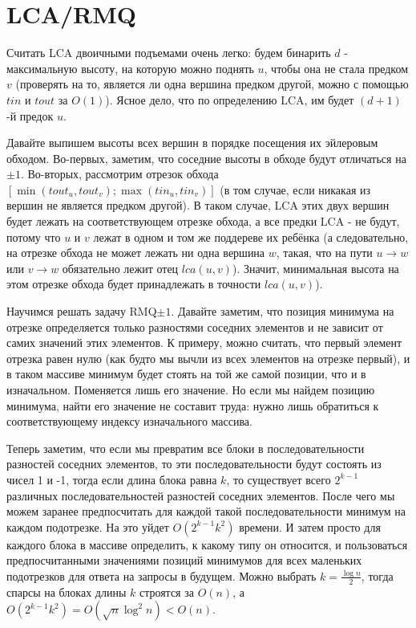 \section{LCA/RMQ}

Считать LCA двоичными подъемами очень легко: будем бинарить $d$ - максимальную высоту, на которую можно поднять $u$, чтобы она не стала предком $v$ (проверять на то, является ли одна вершина предком другой, можно с помощью $tin$ и $tout$ за $O(1)$). Ясное дело, что по определению LCA, им будет $(d+1)$-й предок $u$.

Давайте выпишем высоты всех вершин в порядке посещения их эйлеровым обходом. Во-первых, заметим, что соседние высоты в обходе будут отличаться на $\pm 1$. Во-вторых, рассмотрим отрезок обхода $[\min(tout_u, tout_v); \max(tin_u, tin_v)]$ (в том случае, если никакая из вершин не является предком другой). В таком случае, LCA этих двух вершин будет лежать на соответствующем отрезке обхода, а все предки LCA - не будут, потому что $u$ и $v$ лежат в одном и том же поддереве их ребёнка (а следовательно, на отрезке обхода не может лежать ни одна вершина $w$, такая, что на пути $u \to w$ или $v \to w$ обязательно лежит отец $lca(u, v)$). Значит, минимальная высота на этом отрезке обхода будет принадлежать в точности $lca(u, v)$).

Научимся решать задачу RMQ$\pm 1$. Давайте заметим, что позиция минимума на отрезке определяется только разностями соседних элементов и не зависит от самих значений этих элементов. К примеру, можно считать, что первый элемент отрезка равен нулю (как будто мы вычли из всех элементов на отрезке первый), и в таком массиве минимум будет стоять на той же самой позиции, что и в изначальном. Поменяется лишь его значение. Но если мы найдем позицию минимума, найти его значение не составит труда: нужно лишь обратиться к соответствующему индексу изначального массива.

Теперь заметим, что если мы превратим все блоки в последовательности разностей соседних элементов, то эти последовательности будут состоять из чисел 1 и -1, тогда если длина блока равна $k$, то существует всего $2^{k-1}$ различных последовательностей разностей соседних элементов. После чего мы можем заранее предпосчитать для каждой такой последовательности минимум на каждом подотрезке. На это уйдет $O(2^{k-1} k^2)$ времени. И затем просто для каждого блока в массиве определить, к какому типу он относится, и пользоваться предпосчитанными значениями позиций минимумов для всех маленьких подотрезков для ответа на запросы в будущем. Можно выбрать $k = \frac{\log n}{2}$, тогда спарсы на блоках длины $k$ строятся за $O(n)$, а $O(2^{k-1} k^2) = O(\sqrt{n} \log^2 n) < O(n)$.


